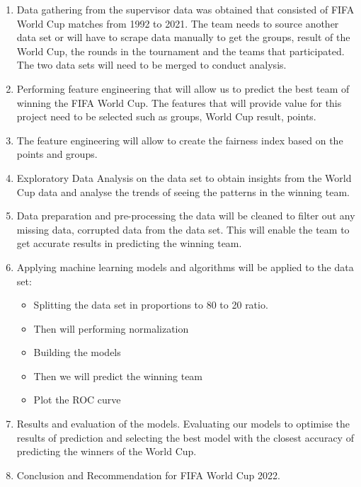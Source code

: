 \documentclass[11pt,a4paper]{article}
\begin{document}
\begin{enumerate}
\item Data gathering from the supervisor data was obtained that consisted of FIFA World Cup matches from 1992 to 2021. The team needs to source another data set or will have to scrape data manually to get the groups, result of the World Cup, the rounds in the tournament and the teams that participated. The two data sets will need to be merged to conduct analysis.

\item Performing feature engineering that will allow us to predict the best team of winning the FIFA World Cup. The features that will provide value for this project need to be selected such as groups, World Cup result, points.

\item The feature engineering will allow to create the fairness index based on the points and groups.

\item Exploratory Data Analysis on the data set to obtain insights from the World Cup data and analyse the trends of seeing the patterns in the winning team.

\item Data preparation and pre-processing the data will be cleaned to filter out any missing data, corrupted data from the data set. This will enable the team to get accurate results in predicting the winning team.

\item Applying machine learning models and algorithms will be applied to the data set:
	\begin{itemize}
	\item Splitting the data set in proportions to 80 to 20 ratio.
	\item Then will performing normalization
	\item Building the models
	\item Then we will predict the winning team
	\item Plot the ROC curve
	\end{itemize}
\item Results and evaluation of the models. Evaluating our models to optimise the results of prediction and selecting the best model with the closest accuracy of predicting the winners of the World Cup.

\item Conclusion and Recommendation for FIFA World Cup 2022.
\end{enumerate}
\end{document}
